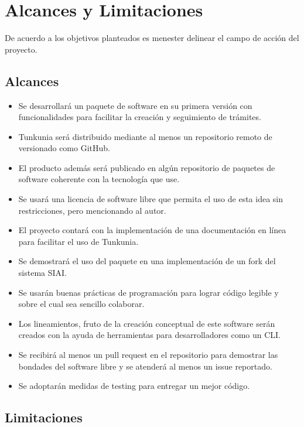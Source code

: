\section{Alcances y Limitaciones}

De acuerdo a los objetivos planteados es menester delinear el campo de acción del proyecto.

\subsection{Alcances}

\begin{itemize}
    \item Se desarrollará un paquete de software en su primera versión con funcionalidades para facilitar la creación y seguimiento de trámites.
    \item Tunkunia será distribuido mediante al menos un repositorio remoto de versionado como GitHub.
    \item El producto además será publicado en algún repositorio de paquetes de software coherente con la tecnología que use.
    \item Se usará una licencia de software libre que permita el uso de esta idea sin restricciones, pero mencionando al autor.
    \item El proyecto contará con la implementación de una documentación en línea para facilitar el uso de Tunkunia.
    \item Se demostrará el uso del paquete en una implementación de un fork del sistema SIAI.
    \item Se usarán buenas prácticas de programación para lograr código legible y sobre el cual sea sencillo colaborar.
    \item Los lineamientos, fruto de la creación conceptual de este software serán creados con la ayuda de herramientas para desarrolladores como un CLI.
    \item Se recibirá al menos un pull request en el repositorio para demostrar las bondades del software libre y se atenderá al menos un issue reportado.
    \item Se adoptarán medidas de testing para entregar un mejor código.

\end{itemize}

\subsection{Limitaciones}

